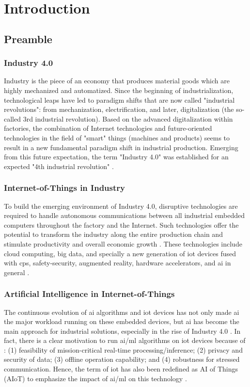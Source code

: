 \chapter{Introduction}\label{chap.intro}
\minitoc
\section{Preamble}
\subsection{Industry 4.0}
Industry is the piece of an economy that produces material goods which are highly mechanized and automatized. Since the beginning of industrialization, technological leaps have led to paradigm shifts that are now called "industrial revolutions": from mechanization, electrification, and later, digitalization (the so-called 3rd industrial revolution). Based on the advanced digitalization within factories, the combination of Internet technologies and future-oriented technologies in the field of "smart" things (machines and products) seems to result in a new fundamental paradigm shift in industrial production. Emerging from this future expectation, the term "Industry 4.0" was established for an expected "4th industrial revolution" \cite{lasi2014industry}.


\subsection{Internet-of-Things in Industry}
To build the emerging environment of Industry 4.0, disruptive technologies are required to handle autonomous communications between all industrial embedded computers throughout the factory and the Internet. Such technologies offer the potential to transform the industry along the entire production chain and stimulate productivity and overall economic growth \cite{espinoza2020estimating}. These technologies include cloud computing, big data, and specially a new generation of \gls{iot} devices fused with \gls{cps}, safety-security, augmented reality, hardware accelerators, and \gls{ai} in general \cite{alcacer2019scanning}.

\subsection{Artificial Intelligence in Internet-of-Things}
The continuous evolution of \gls{ai} algorithms and \gls{iot} devices has not only made \gls{ai} the major workload running on these embedded devices, but \gls{ai} has become the main approach for industrial solutions, especially in the rise of Industry 4.0 \cite{alcacer2019scanning}. In fact, there is a clear motivation to run \gls{ai}/\gls{ml} algorithms on \gls{iot} devices because of \cite{loh20201}: (1) feasibility of mission-critical real-time processing/inference; (2) privacy and security of data; (3) offline operation capability; and (4) robustness for stressed communication. Hence, the term of \gls{iot} has also been redefined as AI of Things (AIoT) to emphasize the impact of \gls{ai}/\gls{ml} on this technology \cite{zhang2020empowering}.

